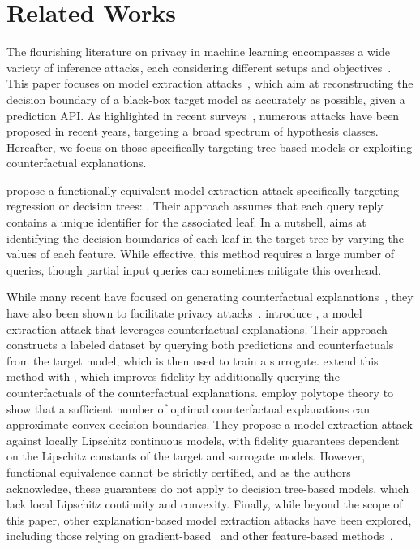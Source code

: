 \section{Related Works}
The flourishing literature on privacy in machine learning encompasses a wide variety of inference attacks, each considering different setups and objectives~\citep{DBLP:journals/corr/abs-2005-08679,DBLP:journals/corr/abs-2007-07646}. 
This paper focuses on model extraction attacks~\citep{Florian2016StealingMachineLearningModels}, which aim at reconstructing the decision boundary of a black-box target model as accurately as possible, given a prediction API. As highlighted in recent surveys~\cite{DBLP:journals/cm/GongWCYJ20,DBLP:journals/csur/OliynykMR23}, numerous attacks have been proposed in recent years, targeting a broad spectrum of hypothesis classes. Hereafter, we focus on those specifically targeting tree-based models or exploiting counterfactual explanations. 

\citet{Florian2016StealingMachineLearningModels} propose a functionally equivalent model extraction attack specifically targeting regression or decision trees: \PathFinding{}. Their approach assumes that each query reply contains a unique identifier for the associated leaf. In a nutshell, \PathFinding{} aims at identifying the decision boundaries of each leaf in the target tree by varying the values of each feature. While effective, this method requires a large number of queries, though partial input queries can sometimes mitigate this overhead.

While many recent have focused on generating counterfactual explanations~\citep{DBLP:journals/datamine/Guidotti24}, they have also been shown to facilitate privacy attacks~\citep{DBLP:conf/aistats/PawelczykLN23}. \citet{aivodji2020model} introduce \CF{}, a model extraction attack that leverages counterfactual explanations. Their approach constructs a labeled dataset by querying both predictions and counterfactuals from the target model, which is then used to train a surrogate. \citet{wang2022dualcf} extend this method with \DualCF{}, which improves fidelity by additionally querying the counterfactuals of the counterfactual explanations.
\citet{dissanayake2024model} employ polytope theory to show that a sufficient number of optimal counterfactual explanations can approximate convex decision boundaries. They propose a model extraction attack against locally Lipschitz continuous models, with fidelity guarantees dependent on the Lipschitz constants of the target and surrogate models. However, functional equivalence cannot be strictly certified, and as the authors acknowledge, these guarantees do not apply to decision tree-based models, which lack local Lipschitz continuity and convexity.
Finally, while beyond the scope of this paper, other explanation-based model extraction attacks have been explored, including those relying on gradient-based~\citep{DBLP:conf/fat/MilliSDH19,DBLP:conf/sectl/MiuraSY24} and other feature-based methods~\citep{oksuz2023autolycus}.